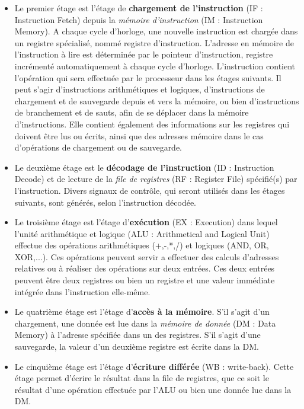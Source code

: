 \begin{itemize}
  \item Le premier étage est l'étage de \textbf{chargement de l'instruction} (IF : Instruction Fetch) depuis la \textit{mémoire d'instruction} (IM : Instruction Memory). A chaque cycle d'horloge, une nouvelle instruction est chargée dans un registre spécialisé, nommé registre d'instruction. L'adresse en mémoire de l'instruction à lire est déterminée par le pointeur d'instruction, registre incrémenté automatiquement à chaque cycle d'horloge. L'instruction contient l'opération qui sera effectuée par le processeur dans les étages suivants. Il peut s'agir d'instructions arithmétiques et logiques, d'instructions de chargement et de sauvegarde depuis et vers la mémoire, ou bien d'instructions de branchement et de sauts, afin de se déplacer dans la mémoire d'instructions. Elle contient également des informations sur les registres qui doivent être lus ou écrits, ainsi que des adresses mémoire dans le cas d'opérations de chargement ou de sauvegarde.

  \item Le deuxième étage est le \textbf{décodage de l'instruction} (ID : Instruction Decode) et de lecture de la \textit{file de registres} (RF : Register File) spécifié(s) par l'instruction. Divers signaux de contrôle, qui seront utilisés dans les étages suivants, sont générés, selon l'instruction décodée.

  \item Le troisième étage est l'étage d'\textbf{exécution} (EX : Execution) dans lequel l'unité arithmétique et logique (ALU : Arithmetical and Logical Unit) effectue des opérations arithmétiques (+,-,*,/) et logiques (AND, OR, XOR,...). Ces opérations peuvent servir a effectuer des calculs d'adresses relatives ou à réaliser des opérations sur deux entrées. Ces deux entrées peuvent être deux registres ou bien un registre et une valeur immédiate intégrée dans l'instruction elle-même.

  \item Le quatrième étage est l'étage d'\textbf{accès à la mémoire}. S'il s'agit d'un chargement, une donnée est lue dans la \textit{mémoire de donnée} (DM : Data Memory) à l'adresse spécifiée dans un des registres. S'il s'agit d'une sauvegarde, la valeur d'un deuxième registre est écrite dans la DM.

  \item Le cinquième étage est l'étage d'\textbf{écriture différée} (WB : write-back). Cette étage permet d'écrire le résultat dans la file de registres, que ce soit le résultat d'une opération effectuée par l'ALU ou bien une donnée lue dans la DM.
\end{itemize}

